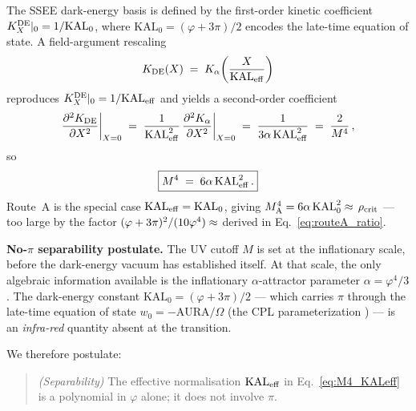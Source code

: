 \documentclass[12pt,a4paper]{article}
\newcommand{\phiG}{\varphi}
\newcommand{\KAL}{\mathrm{KAL}_0}
\newcommand{\KALeff}{\mathrm{KAL}_{\rm eff}}
\renewcommand{\Omega}{\varOmega}
\newcommand{\rhoc}{\rho_{\rm crit}}
\begin{document}
The SSEE dark-energy basis is defined by the first-order kinetic coefficient
$K_X^{\rm DE}|_0 = 1/\KAL$, where $\KAL = (\phiG+3\pi)/2$ encodes the
late-time equation of state.
A field-argument rescaling
\begin{equation}
  K_{\rm DE}(X) \;=\; K_\alpha\!\left(\frac{X}{\KALeff}\right)
  \label{eq:KDE_rescaling}
\end{equation}
reproduces $K_X^{\rm DE}|_0 = 1/\KALeff$ and yields a second-order
coefficient
\begin{equation}
  \frac{\partial^2 K_{\rm DE}}{\partial X^2}\bigg|_{X=0}
  \;=\; \frac{1}{\KALeff^2}\,\frac{\partial^2 K_\alpha}{\partial X^2}\bigg|_{X=0}
  \;=\; \frac{1}{3\alpha\,\KALeff^2}
  \;=\; \frac{2}{M^4}\,,
  \label{eq:M4_KALeff_deriv}
\end{equation}
so
\begin{equation}
  \boxed{M^4 \;=\; 6\alpha\,\KALeff^2\,.}
  \label{eq:M4_KALeff}
\end{equation}
Route~A is the special case $\KALeff = \KAL$, giving
$M^4_{\rm A} = 6\alpha\,\KAL^2 \approx \val{seis_alfa_KAL2_d0}\,\rhoc$
--- too large by the factor $(\phiG+3\pi)^2/(10\phiG^4)\approx \val{KAL_KALeff2_d3}$
derived in Eq.~\eqref{eq:routeA_ratio}.

\medskip
\noindent\textbf{No-$\pi$ separability postulate.}
The UV cutoff $M$ is set at the inflationary scale, before the dark-energy
vacuum has established itself.
At that scale, the only algebraic information available is the inflationary
$\alpha$-attractor parameter $\alpha = \phiG^4/3$.
The dark-energy constant $\KAL = (\phiG+3\pi)/2$ --- which carries $\pi$
through the late-time equation of state $w_0 = -\mathrm{AURA}/\Omega$
(the CPL parameterization \citep{ChevallierPolarski2001,Linder2003}) ---
is an \emph{infra-red} quantity absent at the transition.

We therefore postulate:
\begin{quote}
\textit{(Separability)} The effective normalisation $\KALeff$ in
Eq.~\eqref{eq:M4_KALeff} is a polynomial in $\phiG$ alone; it does not
involve $\pi$.
\end{quote}
\end{document}

